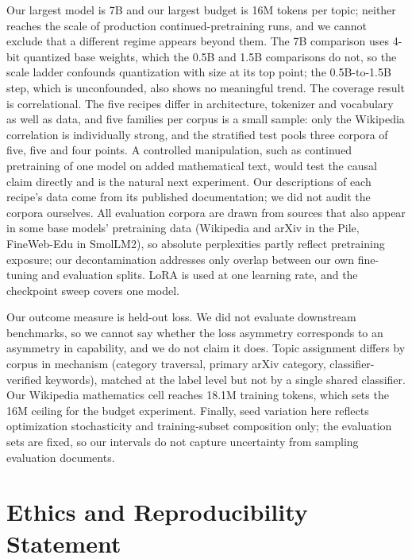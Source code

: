 \documentclass[11pt]{article}
\begin{document}
Our largest model is 7B and our largest budget is 16M tokens per topic;
neither reaches the scale of production continued-pretraining runs, and we
cannot exclude that a different regime appears beyond them. The 7B
comparison uses 4-bit quantized base weights, which the 0.5B and 1.5B
comparisons do not, so the scale ladder confounds quantization with size at
its top point; the 0.5B-to-1.5B step, which is unconfounded, also shows no
meaningful trend. The coverage result is correlational. The five
recipes differ in architecture, tokenizer and vocabulary as well as data,
and five families per corpus is a small sample: only the Wikipedia
correlation is individually strong, and the stratified test pools three
corpora of five, five and four points. A controlled manipulation, such as
continued pretraining of one model on added mathematical text, would test
the causal claim directly and is the natural next experiment. Our
descriptions of each recipe's data come from its published documentation;
we did not audit the corpora ourselves. All evaluation corpora are drawn
from sources that also appear in some base models' pretraining data
(Wikipedia and arXiv in the Pile, FineWeb-Edu in SmolLM2), so absolute
perplexities partly reflect pretraining exposure; our decontamination
addresses only overlap between our own fine-tuning and evaluation splits.
LoRA is used at one learning rate, and the checkpoint sweep covers one
model.

Our outcome measure is held-out loss. We did not evaluate downstream benchmarks, so we cannot say whether
the loss asymmetry corresponds to an asymmetry in capability, and we do not
claim it does. Topic assignment differs by corpus in mechanism (category
traversal, primary arXiv category, classifier-verified keywords), matched at
the label level but not by a single shared classifier. Our Wikipedia
mathematics cell reaches 18.1M training tokens, which sets the 16M ceiling
for the budget experiment. Finally, seed variation here reflects
optimization stochasticity and training-subset composition only; the
evaluation sets are fixed, so our intervals do not capture uncertainty from
sampling evaluation documents.

\section*{Ethics and Reproducibility Statement}
\end{document}
